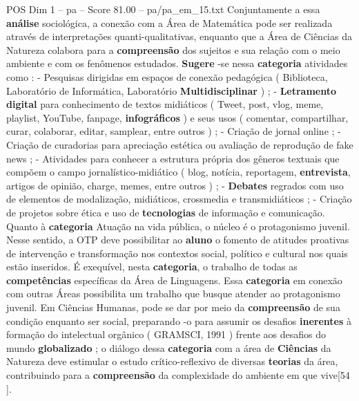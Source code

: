 \begin{textsample}{POS Dim 1 – pa – Score 81.00 – pa/pa\_em\_15.txt}
Conjuntamente a essa \textbf{análise} sociológica, a conexão com a Área de Matemática pode ser realizada através de interpretações quanti-qualitativas, enquanto que a Área de Ciências da Natureza colabora para a \textbf{compreensão} dos sujeitos e sua relação com o meio ambiente e com os fenômenos estudados. \textbf{Sugere} -se nessa \textbf{categoria} atividades como : - Pesquisas dirigidas em espaços de conexão pedagógica ( Biblioteca, Laboratório de Informática, Laboratório \textbf{Multidisciplinar} ) ; - \textbf{Letramento} \textbf{digital} para conhecimento de textos midiáticos ( Tweet, post, vlog, meme, playlist, YouTube, fanpage, \textbf{infográficos} ) e seus usos ( comentar, compartilhar, curar, colaborar, editar, samplear, entre outros ) ; - Criação de jornal online ; - Criação de curadorias para apreciação estética ou avaliação de reprodução de fake news ; - Atividades para conhecer a estrutura própria dos gêneros textuais que compõem o campo jornalístico-midiático ( blog, notícia, reportagem, \textbf{entrevista}, artigos de opinião, charge, memes, entre outros ) ; - \textbf{Debates} regrados com uso de elementos de modalização, midiáticos, crossmedia e transmidiáticos ; - Criação de projetos sobre ética e uso de \textbf{tecnologias} de informação e comunicação.
Quanto à \textbf{categoria} Atuação na vida pública, o núcleo é o protagonismo juvenil.
Nesse sentido, a OTP deve possibilitar ao \textbf{aluno} o fomento de atitudes proativas de intervenção e transformação nos contextos social, político e cultural nos quais estão inseridos.
É exequível, nesta \textbf{categoria}, o trabalho de todas as \textbf{competências} específicas da Área de Linguagens.
Essa \textbf{categoria} em conexão com outras Áreas possibilita um trabalho que busque atender ao protagonismo juvenil.
Em Ciências Humanas, pode se dar por meio da \textbf{compreensão} de sua condição enquanto ser social, preparando -o para assumir os desafios \textbf{inerentes} à formação do intelectual orgânico ( GRAMSCI, 1991 ) frente aos desafios do mundo \textbf{globalizado} ; o diálogo dessa \textbf{categoria} com a área de \textbf{Ciências} da Natureza deve estimular o estudo crítico-reflexivo de diversas \textbf{teorias} da área, contribuindo para a \textbf{compreensão} da complexidade do ambiente em que vive[54 ].

\end{textsample}
